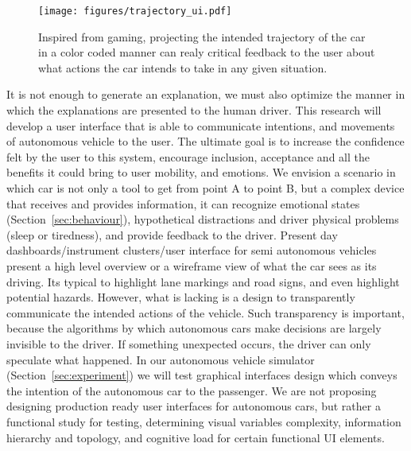 \begin{wrapfigure}{r}{0.45\textwidth}
  \begin{center}
    \texttt{[image: figures/trajectory\_ui.pdf]}
  \end{center}
  \caption{Inspired from gaming, projecting the intended trajectory of the car in a color coded manner can realy critical feedback to the user about what actions the car intends to take in any given situation.}
  \label{fig:trajectory}
\end{wrapfigure}
It is not enough to generate an explanation, we must also optimize the manner in which the explanations are presented to the human driver. 
This research will develop a user interface that is able to communicate intentions, and movements of autonomous vehicle to the user.
The ultimate goal is to increase the confidence felt by the user to this system, encourage inclusion, acceptance and all the benefits it could bring to user mobility, and emotions.
We envision a scenario in which car is not only a tool to get from point A to point B, but a complex device that receives and provides information, it can recognize emotional states (Section~\ref{sec:behaviour}), hypothetical distractions and driver physical problems (sleep or tiredness), and provide feedback to the driver.
Present day dashboards/instrument clusters/user interface for semi autonomous vehicles present a high level overview or a wireframe view of what the car sees as its driving. Its typical to highlight lane markings and road signs, and even highlight potential hazards.
However, what is lacking is a design to transparently communicate the intended actions of the vehicle. 
Such transparency is important, because the algorithms by which autonomous cars make decisions are largely invisible to the driver.
If something unexpected occurs, the driver can only speculate what happened. 
In our autonomous vehicle simulator (Section~\ref{sec:experiment}) we will test graphical interfaces design which conveys the intention of the autonomous car to the passenger. 
We are not proposing designing production ready user interfaces for autonomous cars, but rather a functional study for testing, determining visual variables complexity, information hierarchy and topology, and cognitive load for certain functional UI elements. 
